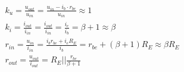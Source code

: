         \begin{gather}
            k_u    = \frac{u_{out}}{u_{in}} = \frac{u_{in}-i_b\cdot r_{be}}{u_{in}} \approx 1\\
            k_i    = \frac{i_{out}}{i_{in}} = \frac{i_{out}}{i_{in}} = \frac{i_e}{i_b} = \beta+1 \approx \beta\\
            r_{in} = \frac{u_{in}}{i_{in}} = \frac{i_b r_{be} + i_eR_E}{i_b} = r_{be}+(\beta+1)R_E \approx \beta R_E\\
            r_{out} = \frac{u_{out}}{i_{out}} = R_E || \frac{r_{be}}{\beta+1}
        \end{gather}